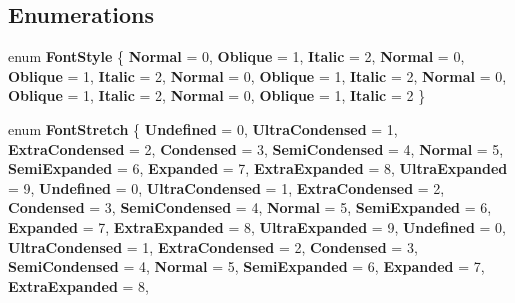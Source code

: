 \subsection*{Enumerations}
\begin{DoxyCompactItemize}
\item 
\mbox{\label{namespace_windows_1_1_u_i_1_1_text_a60a89aee1a9831c91a4aabca7103b5e8}} 
enum {\bfseries Font\+Style} \{ \newline
{\bfseries Normal} = 0, 
{\bfseries Oblique} = 1, 
{\bfseries Italic} = 2, 
{\bfseries Normal} = 0, 
\newline
{\bfseries Oblique} = 1, 
{\bfseries Italic} = 2, 
{\bfseries Normal} = 0, 
{\bfseries Oblique} = 1, 
\newline
{\bfseries Italic} = 2, 
{\bfseries Normal} = 0, 
{\bfseries Oblique} = 1, 
{\bfseries Italic} = 2, 
\newline
{\bfseries Normal} = 0, 
{\bfseries Oblique} = 1, 
{\bfseries Italic} = 2
 \}
\item 
\mbox{\label{namespace_windows_1_1_u_i_1_1_text_a5d8427c75e3dbef5872b8609b90b88e2}} 
enum {\bfseries Font\+Stretch} \{ \newline
{\bfseries Undefined} = 0, 
{\bfseries Ultra\+Condensed} = 1, 
{\bfseries Extra\+Condensed} = 2, 
{\bfseries Condensed} = 3, 
\newline
{\bfseries Semi\+Condensed} = 4, 
{\bfseries Normal} = 5, 
{\bfseries Semi\+Expanded} = 6, 
{\bfseries Expanded} = 7, 
\newline
{\bfseries Extra\+Expanded} = 8, 
{\bfseries Ultra\+Expanded} = 9, 
{\bfseries Undefined} = 0, 
{\bfseries Ultra\+Condensed} = 1, 
\newline
{\bfseries Extra\+Condensed} = 2, 
{\bfseries Condensed} = 3, 
{\bfseries Semi\+Condensed} = 4, 
{\bfseries Normal} = 5, 
\newline
{\bfseries Semi\+Expanded} = 6, 
{\bfseries Expanded} = 7, 
{\bfseries Extra\+Expanded} = 8, 
{\bfseries Ultra\+Expanded} = 9, 
\newline
{\bfseries Undefined} = 0, 
{\bfseries Ultra\+Condensed} = 1, 
{\bfseries Extra\+Condensed} = 2, 
{\bfseries Condensed} = 3, 
\newline
{\bfseries Semi\+Condensed} = 4, 
{\bfseries Normal} = 5, 
{\bfseries Semi\+Expanded} = 6, 
{\bfseries Expanded} = 7, 
\newline
{\bfseries Extra\+Expanded} = 8, 

\end{DoxyCompactItemize}
